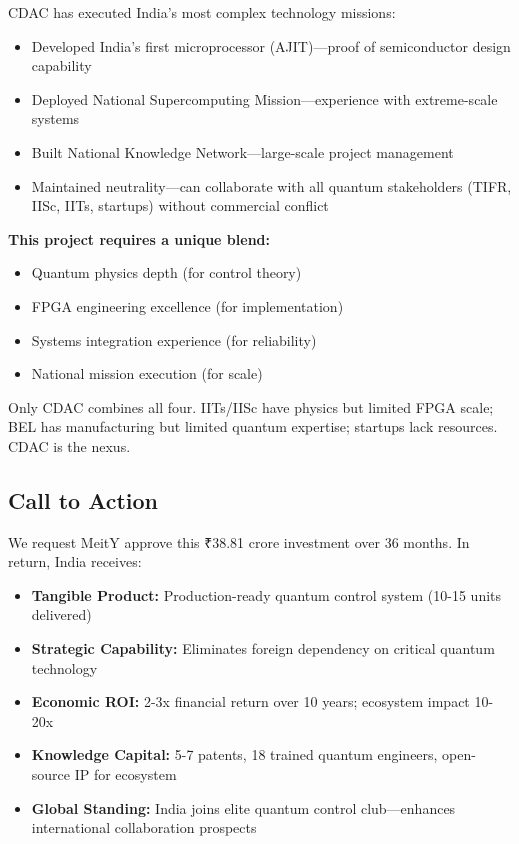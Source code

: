 \documentclass[12pt,a4paper]{article}
\begin{document}
\begin{enumerate}[leftmargin=*]
CDAC has executed India's most complex technology missions:
\begin{itemize}[leftmargin=*]
    \item Developed India's first microprocessor (AJIT)—proof of semiconductor design capability
    \item Deployed National Supercomputing Mission—experience with extreme-scale systems
    \item Built National Knowledge Network—large-scale project management
    \item Maintained neutrality—can collaborate with all quantum stakeholders (TIFR, IISc, IITs, startups) without commercial conflict
\end{itemize}

\textbf{This project requires a unique blend:}
\begin{itemize}[leftmargin=*]
    \item Quantum physics depth (for control theory)
    \item FPGA engineering excellence (for implementation)
    \item Systems integration experience (for reliability)
    \item National mission execution (for scale)
\end{itemize}

Only CDAC combines all four. IITs/IISc have physics but limited FPGA scale; BEL has manufacturing but limited quantum expertise; startups lack resources. CDAC is the nexus.

\subsection{Call to Action}

We request MeitY approve this ₹38.81 crore investment over 36 months. In return, India receives:

\begin{itemize}[leftmargin=*]
    \item \textbf{Tangible Product:} Production-ready quantum control system (10-15 units delivered)
    \item \textbf{Strategic Capability:} Eliminates foreign dependency on critical quantum technology
    \item \textbf{Economic ROI:} 2-3x financial return over 10 years; ecosystem impact 10-20x
    \item \textbf{Knowledge Capital:} 5-7 patents, 18 trained quantum engineers, open-source IP for ecosystem
    \item \textbf{Global Standing:} India joins elite quantum control club—enhances international collaboration prospects
\end{itemize}


\end{enumerate}
\end{document}
